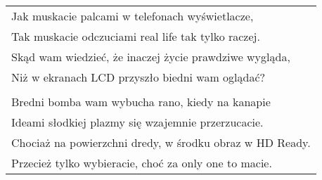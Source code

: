 \documentclass[a5paper]{article}
\begin{document}
\noindent
\begin{tabular}{@{}p{12cm}@{}}
Jak muskacie palcami w telefonach wyświetlacze, \\
Tak muskacie odczuciami real life tak tylko raczej. \\
Skąd wam wiedzieć, że inaczej życie prawdziwe wygląda, \\
Niż w ekranach LCD przyszło biedni wam oglądać? \\ \\
Bredni bomba wam wybucha rano, kiedy na kanapie \\
Ideami słodkiej plazmy się wzajemnie przerzucacie. \\
Chociaż na powierzchni dredy, w środku obraz w HD Ready. \\
Przecież tylko wybieracie, choć za only one to macie.
\end{tabular}
\end{document}
